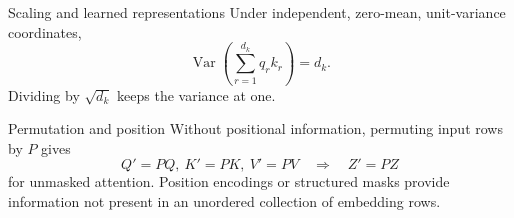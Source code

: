 \documentclass[aspectratio=169,11pt]{beamer}
\newcommand{\notestarget}{notes.pdf}\newcommand{\noteslabel}{Notes}
\begin{document}
\renewcommand{\notestarget}{notes.pdf\#note-scaling-and-learned-representations}
\begin{frame}[t,fragile,label=slide-scaling-and-learned-representations]{Scaling and learned representations}
Under independent, zero-mean, unit-variance coordinates,
\[
\operatorname{Var}\left(\sum_{r=1}^{d_k}q_rk_r\right)=d_k.
\]
\pause{}
Dividing by $\sqrt{d_k}$ keeps the variance at one.
\end{frame}
\renewcommand{\notestarget}{notes.pdf\#note-scaling-and-learned-representations}
\begin{frame}[t,fragile,label=slide-permutation-and-position]{Permutation and position}
Without positional information, permuting input rows by $P$ gives
\[
Q'=PQ,\ K'=PK,\ V'=PV\quad\Longrightarrow\quad Z'=PZ
\]
for unmasked attention.
\pause{}
Position encodings or structured masks provide information not present in an unordered collection of embedding rows.
\end{frame}
\end{document}
